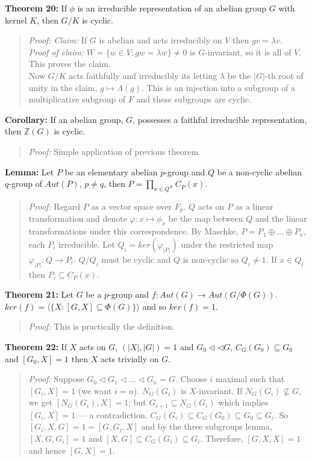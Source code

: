 {\bf Theorem 20:}
If $\phi$ is an irreducible representation of an abelian group $G$ with kernel $K$, then
$G/K$ is cyclic.
\begin{quote}
\emph{Proof:}  \emph{Claim:} If $G$ is abelian and acts irreducibly on $V$ then $gv= \lambda v$.\\
\emph{Proof of claim:}  $W= \{ w \in V: gw= \lambda w \} \ne 0$ is $G$-invariant,
so it is all of $V$.  This proves the claim.\\
Now $G/K$ acts faithfully and irreducibly its letting $\lambda$ be the
$|G|$-th root of unity in the claim, $g \mapsto \Lambda(g)$.  This is an injection into
a subgroup of a multiplicative subgroup of $F$ and these subgroups are cyclic.
\end{quote}
{\bf Corollary:}  If an abelian group, $G$, possesses a faithful irreducible representation, then
${\mathbb Z}(G)$ is cyclic.
\begin{quote}
\emph{Proof:}  Simple application of previous theorem.
\end{quote}
{\bf Lemma:} Let $P$ be an elementary abelian $p$-group and $Q$ be a non-cyclic
abelian $q$-group of $Aut(P)$, $p \ne q$, then $P= \prod_{x \in Q^{\#}} C_P(x)$.
\begin{quote}
\emph{Proof:}  Regard $P$ as a vector space over $F_p$.  $Q$ acts on $P$ as a linear transformation
and denote $\varphi: x \mapsto \phi_x$ be the map between $Q$ and the linear transformations
under this correspondence.
By Maschke, $P= P_1 \oplus \ldots \oplus P_n$, each $P_i$ irreducible.
Let $Q_i= ker(\varphi_{|P_i})$ under the restricted map $\varphi_{|P_i}: Q \rightarrow P_i$.
$Q/Q_i$ must be cyclic and $Q$ is non-cyclic so
$Q_i \ne 1$.  If $x \in Q_i$ then $P_i \subseteq C_P(x)$.
\end{quote}
{\bf Theorem 21:}
Let $G$ be a $p$-group and
$f: Aut(G) \rightarrow Aut(G/\Phi(G))$.  $ker(f)= \langle \{ X: [G, X] \subseteq \Phi(G) \} \rangle$ and so $ker(f) = 1$.
\begin{quote}
\emph{Proof:}  This is practically the definition.
\end{quote}
{\bf Theorem 22:}
If $X$ acts on $G$, $(|X|, |G|)= 1$ and $G_0 \lhd \lhd G$, $C_G(G_0) \subseteq G_0$ and
$[G_0 , X] =1$ then $X$ acts trivially on $G$.
\begin{quote}
\emph{Proof:}  Suppose $G_0 \lhd G_1 \lhd \ldots \lhd G_n = G$.  Choose $i$ maximal such that
$[G_i, X]= 1$ (we want $i=n$).  $N_G(G_i)$ is $X$-invariant.  If
$N_G(G_i) \nsubseteq G$, we get $[N_G(G_i ), X]= 1$; but $G_{i+1} \subseteq N_G(G_i )$ which
implies $[G_i, X]= 1$ --- a contradiction.
$C_G(G_i ) \subseteq C_G(G_0) \subseteq G_0 \subseteq G_i$.
So $[G_i, X, G]=1= [G, G_i, X]$ and by the three subgroups lemma,
$[X,G,G_i]= 1$ and $[X,G] \subseteq C_G(G_i) \subseteq G_i$.
Therefore, $[G,X,X]=1$ and hence $[G,X]= 1$.
\end{quote}
